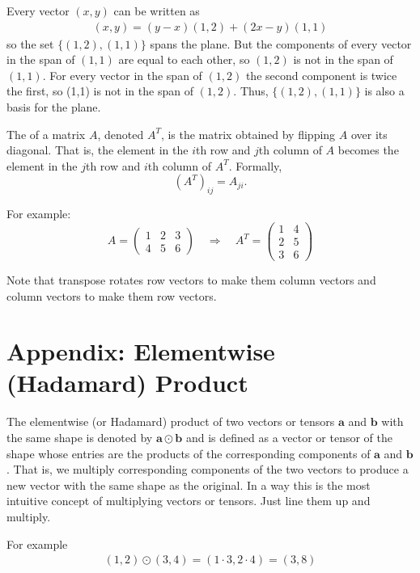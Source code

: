    Every vector $(x,y)$ can be written as
\begin{eqnarray*}
 (x,y) =(y-x)(1,2) +(2x-y)(1,1)
\end{eqnarray*}  
so the set $\{ (1,2), (1,1) \}$ spans the plane. But the components of every 
vector in the span of $(1,1)$ are equal to each other, so $(1,2)$ is not in the 
span of $(1,1)$. For every vector in the span of $(1,2)$ the second
component is twice the first, so (1,1) is not in the span of $(1,2)$. Thus, 
$\{ (1,2), (1,1) \}$ is also a basis for the plane. 

The  of a matrix \( A \), denoted \( A^T \), is the matrix obtained by flipping \( A \) over its diagonal. That is, the element in the \( i \)th row and \( j \)th column of \( A \) becomes the element in the \( j \)th row and \( i \)th column of \( A^T \). Formally, 
\[
(A^T)_{ij} = A_{ji}.
\]

For example: 
\[
A = \begin{pmatrix}
1 & 2 & 3 \\
4 & 5 & 6
\end{pmatrix}
\quad \Rightarrow \quad
A^T = \begin{pmatrix}
1 & 4 \\
2 & 5 \\
3 & 6
\end{pmatrix}
\]

Note that transpose rotates row vectors to make them column vectors and column vectors to make them row vectors.

\section{Appendix: Elementwise (Hadamard) Product}\label{hadamard}

The elementwise (or Hadamard) product of two vectors or tensors $\mathbf{a}$ and $\mathbf{b}$ with the same shape is denoted by $\mathbf{a} \odot \mathbf{b}$ and is defined as a vector or tensor of the shape whose entries are the products of the corresponding components of $\mathbf{a}$  and $\mathbf{b}$. That is, we multiply corresponding components of the two vectors to produce a new vector with the same shape as the original. In a way this is the most intuitive concept of multiplying vectors or tensors. Just line them up and multiply.

For example
\begin{eqnarray}
(1,2) \odot (3,4) = (1 \cdot 3,  2 \cdot 4) =  (3,8)
\end{eqnarray}

